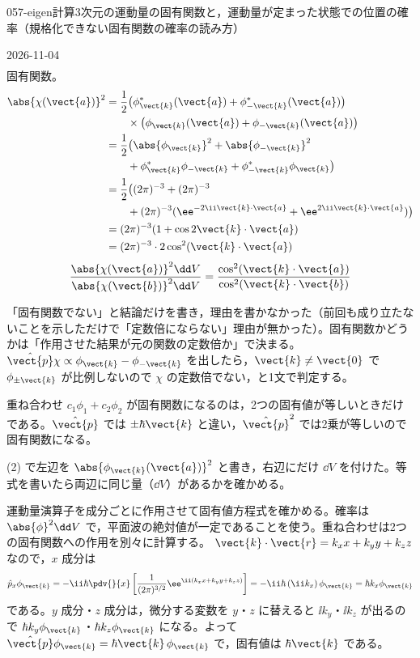 \documentclass[uplatex,dvipdfmx,a4paper,11pt]{jsarticle}
\begin{document}
\begin{mondai}{057-eigen}{計算}{3次元の運動量の固有関数と，運動量が定まった状態での位置の確率（規格化できない固有関数の確率の読み方）}
\begin{kotaeutsushi}{2026-11-04}
\begin{align*}
\end{align*}
固有関数。
\begin{align*}
\abs{\chi(\vect{a})}^{2}&=\frac{1}{2}\bigl(\phi_{\vect{k}}^{*}(\vect{a})+\phi_{-\vect{k}}^{*}(\vect{a})\bigr)\\
&\qquad\times\bigl(\phi_{\vect{k}}(\vect{a})+\phi_{-\vect{k}}(\vect{a})\bigr)\\
&=\frac{1}{2}\bigl(\abs{\phi_{\vect{k}}}^{2}+\abs{\phi_{-\vect{k}}}^{2}\\
&\qquad+\phi_{\vect{k}}^{*}\phi_{-\vect{k}}+\phi_{-\vect{k}}^{*}\phi_{\vect{k}}\bigr)\\
&=\frac{1}{2}\bigl((2\pi)^{-3}+(2\pi)^{-3}\\
&\qquad+(2\pi)^{-3}(\ee^{-2\ii\vect{k}\cdot\vect{a}}+\ee^{2\ii\vect{k}\cdot\vect{a}})\bigr)\\
&=(2\pi)^{-3}(1+\cos2\vect{k}\cdot\vect{a})\\
&=(2\pi)^{-3}\cdot2\cos^{2}(\vect{k}\cdot\vect{a})
\end{align*}
\[ \frac{\abs{\chi(\vect{a})}^{2}\dd V}{\abs{\chi(\vect{b})}^{2}\dd V}=\frac{\cos^{2}(\vect{k}\cdot\vect{a})}{\cos^{2}(\vect{k}\cdot\vect{b})} \]
\end{kotaeutsushi}
\begin{kizuki}
\item {} 「固有関数でない」と結論だけを書き，理由を書かなかった（前回も成り立たないことを示しただけで「定数倍にならない」理由が無かった）。固有関数かどうかは「作用させた結果が元の関数の定数倍か」で決まる。$\hat{\vect{p}}\chi\propto\phi_{\vect{k}}-\phi_{-\vect{k}}$ を出したら，$\vect{k}\neq\vect{0}$ で $\phi_{\pm\vect{k}}$ が比例しないので $\chi$ の定数倍でない，と1文で判定する。
\item 重ね合わせ $c_{1}\phi_{1}+c_{2}\phi_{2}$ が固有関数になるのは，2つの固有値が等しいときだけである。$\hat{\vect{p}}$ では $\pm\hbar\vect{k}$ と違い，$\hat{\vect{p}}^{2}$ では2乗が等しいので固有関数になる。
\item (2) で左辺を $\abs{\phi_{\vect{k}}(\vect{a})}^{2}$ と書き，右辺にだけ $\dd V$ を付けた。等式を書いたら両辺に同じ量（$\dd V$）があるかを確かめる。
\end{kizuki}
\begin{tadashii}
\houshin 運動量演算子を成分ごとに作用させて固有値方程式を確かめる。確率は $\abs{\phi}^{2}\dd V$ で，平面波の絶対値が一定であることを使う。重ね合わせは2つの固有関数への作用を別々に計算する。
\keisan {} $\vect{k}\cdot\vect{r}=k_{x}x+k_{y}y+k_{z}z$ なので，$x$ 成分は
\[ \hat{p}_{x}\phi_{\vect{k}}=-\ii\hbar\pdv{}{x}\left[\frac{1}{(2\pi)^{3/2}}\ee^{\ii(k_{x}x+k_{y}y+k_{z}z)}\right]=-\ii\hbar\,(\ii k_{x})\,\phi_{\vect{k}}=\hbar k_{x}\phi_{\vect{k}} \]
である。$y$ 成分・$z$ 成分は，微分する変数を $y$・$z$ に替えると $\ii k_{y}$・$\ii k_{z}$ が出るので $\hbar k_{y}\phi_{\vect{k}}$・$\hbar k_{z}\phi_{\vect{k}}$ になる。よって $\hat{\vect{p}}\phi_{\vect{k}}=\hbar\vect{k}\,\phi_{\vect{k}}$ で，固有値は $\hbar\vect{k}$ である。


\end{tadashii}
\end{mondai}
\end{document}
